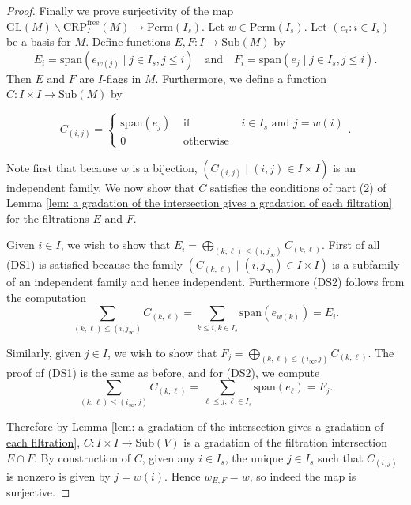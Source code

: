 \documentclass[oneside,11pt]{amsart}
\newcommand{\free}{\ensuremath{\text{free}}}
\newcommand{\CRP}{\ensuremath{\text{CRP}}}
\newcommand{\GL}{\ensuremath{\text{GL}}}
\newcommand{\Sub}{\ensuremath{\text{Sub}}}
\newcommand{\Perm}{\ensuremath{\text{Perm}}}
\newcommand{\Span}{\ensuremath{\text{span}}}
\theoremstyle{definition}
\newtheorem{proof techniques}{Proof Techniques}
\begin{document}
\begin{proof}
Finally we prove surjectivity of the map $\GL(M) \backslash \CRP_I^\free(M) \to \Perm(I_s)$. Let $w \in \Perm(I_s)$. Let $(e_i : i \in I_s)$ be a basis for $M$. Define functions $E, F : I \to \Sub(M)$ by 
\begin{equation*}
E_i = \Span( e_{w(j)} \mid j \in I_s , j \leq i ) \ \ \ \text{ and } \ \ \  F_i = \Span( e_j \mid j \in I_s , j \leq i ) .
\end{equation*}
Then $E$ and $F$ are $I$-flags in $M$. Furthermore, we define a function $C : I \times I \to \Sub(M)$ by 

\begin{equation*}
C_{(i , j)} = \left\{ \begin{matrix} \Span(e_j) & \text{ if } & i \in I_s \text{ and } j = w(i) \\ 0 & \text{ otherwise } & \end{matrix} \right. .
\end{equation*}

Note first that because $w$ is a bijection, $( C_{(i , j)} \mid (i , j) \in I \times I )$ is an independent family. We now show that $C$ satisfies the conditions of part (2) of Lemma \ref{lem: a gradation of the intersection gives a gradation of each filtration} for the filtrations $E$ and $F$. 

Given $i \in I$, we wish to show that $E_i = \bigoplus_{(k , \ell) \leq (i , j_{\infty})} C_{(k , \ell)}$. First of all (DS1) is satisfied because the family $( C_{(k , \ell)} \mid (i , j_{\infty}) \in I \times I )$ is a subfamily of an independent family and hence independent. Furthermore (DS2) follows from the computation
\begin{equation*}
\sum_{(k , \ell) \leq (i , j_{\infty})} C_{(k , \ell)} = \sum_{k \leq i , k \in I_s} \Span( e_{w(k)} ) = E_i.  
\end{equation*}
 
 Similarly, given $j \in I$, we wish to show that $F_j = \bigoplus_{(k , \ell) \leq (i_{\infty} , j)} C_{(k , \ell)}$. The proof of (DS1) is the same as before, and for (DS2), we compute
 \begin{equation*}
\sum_{(k , \ell) \leq (i_{\infty} , j)} C_{(k , \ell)} = \sum_{\ell \leq j, \ell \in I_s} \Span( e_{\ell} ) = F_j.  
\end{equation*}

Therefore by Lemma \ref{lem: a gradation of the intersection gives a gradation of each filtration}, $C: I \times I \to \Sub(V)$ is a gradation of the filtration intersection $E \cap F$. By construction of $C$, given any $i \in I_s$, the unique $j \in I_s$ such that $C_{(i , j)}$ is nonzero is given by $j = w(i)$. Hence $w_{E , F} = w$, so indeed the map is surjective. 

\end{proof}
\end{document}
